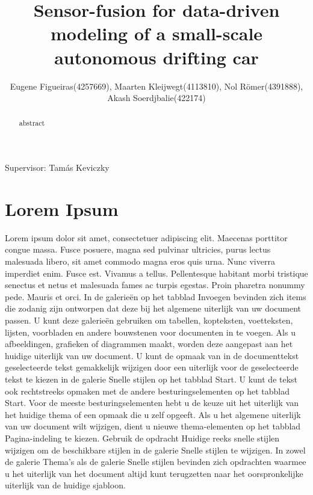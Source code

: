 \documentclass[a4paper,twoside,10pt,twocolumn,notitlepage]{report}
\author{Eugene Figueiras(4257669), Maarten Kleijwegt(4113810), Nol R{\"o}mer(4391888), Akash Soerdjbalie(422174)}
\begin{document}
\title{Sensor-fusion for data-driven modeling of a small-scale autonomous drifting car}
\maketitle
Supervisor: Tam{\'a}s Keviczky

\begin{abstract}
abstract
\end{abstract}

\section{Lorem Ipsum}
Lorem ipsum dolor sit amet, consectetuer adipiscing elit. Maecenas porttitor congue massa. Fusce posuere, magna sed pulvinar ultricies, purus lectus malesuada libero, sit amet commodo magna eros quis urna.
Nunc viverra imperdiet enim. Fusce est. Vivamus a tellus.
Pellentesque habitant morbi tristique senectus et netus et malesuada fames ac turpis egestas. Proin pharetra nonummy pede. Mauris et orci.
In de galerieën op het tabblad Invoegen bevinden zich items die zodanig zijn ontworpen dat deze bij het algemene uiterlijk van uw document passen. U kunt deze galerieën gebruiken om tabellen, kopteksten, voetteksten, lijsten, voorbladen en andere bouwstenen voor documenten in te voegen. Als u afbeeldingen, grafieken of diagrammen maakt, worden deze aangepast aan het huidige uiterlijk van uw document.
U kunt de opmaak van in de documenttekst geselecteerde tekst gemakkelijk wijzigen door een uiterlijk voor de geselecteerde tekst te kiezen in de galerie Snelle stijlen op het tabblad Start. U kunt de tekst ook rechtstreeks opmaken met de andere besturingselementen op het tabblad Start. Voor de meeste besturingselementen hebt u de keuze uit het uiterlijk van het huidige thema of een opmaak die u zelf opgeeft.
Als u het algemene uiterlijk van uw document wilt wijzigen, dient u nieuwe thema-elementen op het tabblad Pagina-indeling te kiezen. Gebruik de opdracht Huidige reeks snelle stijlen wijzigen om de beschikbare stijlen in de galerie Snelle stijlen te wijzigen. In zowel de galerie Thema's als de galerie Snelle stijlen bevinden zich opdrachten waarmee u het uiterlijk van het document altijd kunt terugzetten naar het oorspronkelijke uiterlijk van de huidige sjabloon.
\end{document}
